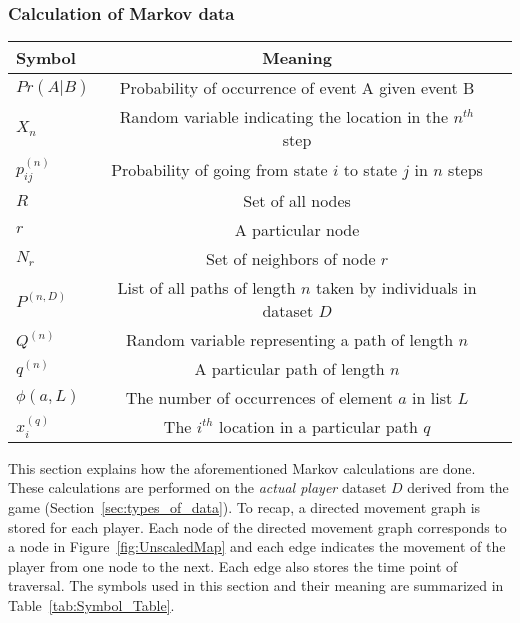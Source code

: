 
\subsubsection{Calculation of Markov data} %
\label{sec:calculation_of_Markov_data}

\begin{table*}[!bp]
\caption{Summary of symbols and their meaning.}
\label{tab:Symbol_Table}
\begin{tabular}{lcc}\hline

Symbol & Meaning   \\ \hline
$Pr (A|B)$ & Probability of occurrence of event A given event B \\
$X_n$ & Random variable indicating the location in the $n^{th}$ step \\
$p^{(n)}_{ij}$ & Probability of going from state $i$ to state $j$ in $n$ steps \\
$R$ & Set of all nodes \\
$r$ & A particular node \\
$N_r$ & Set of neighbors of node $r$ \\
$P^{(n,D)}$ & List of all paths of length $n$ taken by individuals in dataset $D$\\
$Q^{(n)}$ & Random variable representing a path of length $n$\\
$q^{(n)}$ & A particular path of length $n$\\
$\phi(a,L)$ & The number of occurrences of element $a$ in list $L$\\
$x^{(q)}_{i}$ & The $i^{th}$ location in a particular path $q$\\

\hline
\end{tabular}
\end{table*}

This section explains how the aforementioned Markov calculations are done. These calculations are performed on the \emph{actual player} dataset $D$ derived from the game (Section~\ref{sec:types_of_data}). To recap, a directed movement graph is stored for each player. Each node of the directed movement graph corresponds to a node in Figure~\ref{fig:UnscaledMap} and each edge indicates the movement of the player from one node to the next. Each edge also stores the time point of traversal. The symbols used in this section and their meaning are summarized in Table~\ref{tab:Symbol_Table}.


